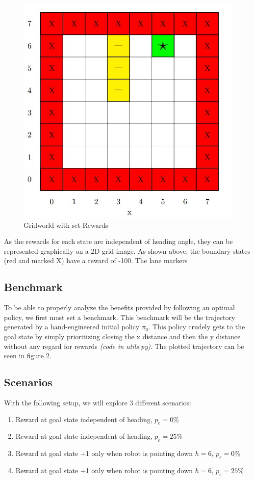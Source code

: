 \documentclass[fullpage]{article}
\begin{document}
\begin{figure}[t!]
\centering
\includegraphics{images/gridworld.jpg}
\caption{Gridworld with set Rewards}
\label{fig:gridworld}
\end{figure}

As the rewards for each state are independent of heading angle, they can be represented graphically on a 2D grid image. As shown above, the boundary states (red and marked X) have a reward of -100. The lane markers 

\subsection{Benchmark}
To be able to properly analyze the benefits provided by following an optimal policy, we first must set a benchmark. This benchmark will be the trajectory generated by a hand-engineered initial policy $\pi_0$. This policy crudely gets to the goal state by simply prioritizing closing the x distance and then the y distance without any regard for rewards \textit{(code in utils.py)}. The plotted trajectory can be seen in figure 2.

\subsection{Scenarios}
With the following setup, we will explore 3 different scenarios:
\begin{enumerate}
\item Reward at goal state independent of heading, $p_e = 0\%$
\item Reward at goal state independent of heading, $p_e=25\%$
\item Reward at goal state +1 only when robot is pointing down $h=6$, $p_e=0\%$
\item Reward at goal state +1 only when robot is pointing down $h=6$, $p_e=25\%$
\end{enumerate}
\end{document}
